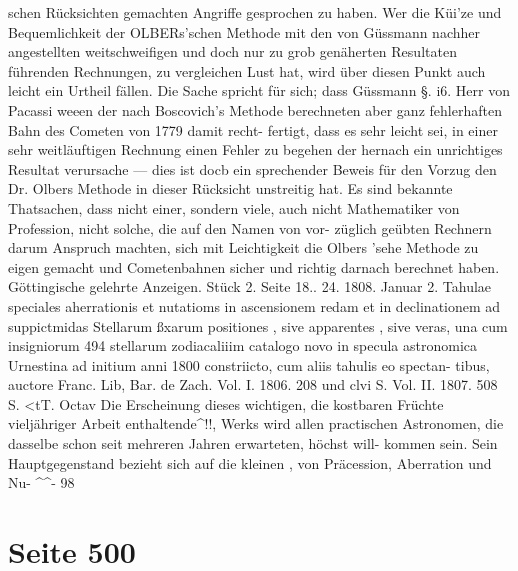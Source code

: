 \documentclass[10pt,a4paper]{article}
\begin{document}
schen Rücksichten  gemachten  Angriffe  gesprochen  zu  haben.  Wer  die  Küi'ze  und  Bequemlichkeit  der
OLBERs'schen  Methode  mit  den  von  Güssmann  nachher  angestellten  weitschweifigen  und  doch  nur  zu  grob
genäherten  Resultaten  führenden  Rechnungen,  zu  vergleichen  Lust  hat,  wird  über  diesen  Punkt  auch
leicht  ein  Urtheil  fällen.  Die  Sache  spricht  für  sich;  dass  Güssmann  §.  i6.  Herr  von  Pacassi  weeen  der
nach  Boscovich's  Methode  berechneten  aber  ganz  fehlerhaften  Bahn  des  Cometen  von  1779  damit  recht-
fertigt, dass  es  sehr  leicht  sei,  in  einer  sehr  weitläuftigen  Rechnung  einen  Fehler  zu  begehen  der
hernach  ein  unrichtiges  Resultat  verursache  ---  dies  ist  docb  ein  sprechender  Beweis  für  den  Vorzug
den  Dr.  Olbers  Methode  in  dieser  Rücksicht  unstreitig  hat.  Es  sind  bekannte  Thatsachen,  dass  nicht
einer,  sondern  viele,  auch  nicht  Mathematiker  von  Profession,  nicht  solche,  die  auf  den  Namen  von  vor-
züglich geübten  Rechnern  darum  Anspruch  machten,  sich  mit  Leichtigkeit  die  Olbers 'sehe  Methode  zu
eigen  gemacht  und  Cometenbahnen  sicher  und  richtig  darnach  berechnet  haben.
Göttingische  gelehrte  Anzeigen.     Stück  2.     Seite  18.. 24.     1808.  Januar  2.
Tahulae  speciales  aherrationis  et  nutatioms  in  ascensionem  redam  et  in  declinationem  ad  suppictmidas
Stellarum  ßxarum  positiones ,  sive  apparentes ,  sive  veras,  una  cum  insigniorum  494  stellarum  zodiacaliiim
catalogo  novo  in  specula  astronomica  Urnestina  ad  initium  anni  1800  constriicto,  cum  aliis  tahulis  eo  spectan-
tibus,  auctore  Franc.  Lib,  Bar.  de  Zach.     Vol.  I.  1806.     208  und  clvi  S.     Vol.  II.  1807.    508  S.  <tT.  Octav
Die  Erscheinung  dieses  wichtigen,  die  kostbaren  Früchte  vieljähriger  Arbeit  enthaltende\textasciicircum{}!!,  Werks
wird  allen  practischen  Astronomen,  die  dasselbe  schon  seit  mehreren  Jahren  erwarteten,  höchst  will-
kommen sein.    Sein  Hauptgegenstand  bezieht  sich  auf  die  kleinen ,  von  Präcession,  Aberration  und  Nu-
\textasciicircum{}\textasciicircum{}-  98

\newpage
\section*{Seite 500}
\end{document}
